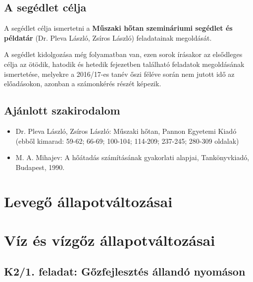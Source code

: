 \documentclass[11pt, a4paper]{report}
\begin{document}
\section*{A segédlet célja}

A segédlet célja ismertetni a \textbf{Műszaki hőtan szemináriumi segédlet és példatár} (Dr. Pleva László, Zsíros László) feladatainak megoldását.

A segédlet kidolgozása még folyamatban van, ezen sorok írásakor az elsődleges célja az ötödik, hatodik és hetedik fejezetben található feladatok megoldásának ismertetése, melyekre a 2016/17-es tanév őszi féléve során nem jutott idő az előadásokon, azonban a számonkérés részét képezik.


\section*{Ajánlott szakirodalom}

\begin{itemize}
	\item Dr. Pleva László, Zsíros László: Műszaki hőtan, Pannon Egyetemi Kiadó (ebből kimarad: 59-62; 66-69; 100-104; 114-209; 237-245; 280-309 oldalak)
	\item M. A. Mihajev: A hőátadás számításának gyakorlati alapjai, Tankönyvkiadó, Budapest, 1990.
\end{itemize}


\chapter{Levegő állapotváltozásai}




\chapter{Víz és vízgőz állapotváltozásai}

\section*{K2/1. feladat: Gőzfejlesztés állandó nyomáson}




\end{document}
